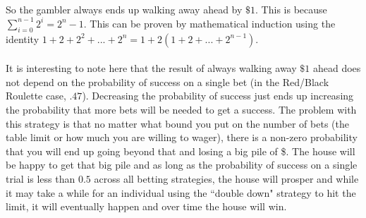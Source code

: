 \documentclass[11pt,a4paper]{report}
\theoremstyle{plain}
\theoremstyle{definition}
\theoremstyle{remark}
\begin{document}
	\\\\
	So the gambler always ends up walking away ahead by $\$1$.  This is because $\sum_{i=0}^{n - 1} {2^i} = 2^{n} - 1.$ This can be proven by mathematical induction using the identity $1 + 2 + 2^2 + ... + 2^n = 1 + 2(1 + 2 + ... + 2^{n-1})$. 
	\\\\
	It is interesting to note here that the result of always walking away $\$1$ ahead does not depend on the probability of success on a single bet (in the Red/Black Roulette case, $.47$).  Decreasing the probability of success just ends up increasing the probability that more bets will be needed to get a success.  The problem with this strategy is that no matter what bound you put on the number of bets (the table limit or how much you are willing to wager), there is a non-zero probability that you will end up going beyond that and losing a big pile of \$.  The house will be happy to get that big pile and as long as the probability of success on a single trial is less than $0.5$ across all betting strategies, the house will prosper and while it may take a while for an individual using the ``double down" strategy to hit the limit, it will eventually happen and over time the house will win.

	
\end{document}
